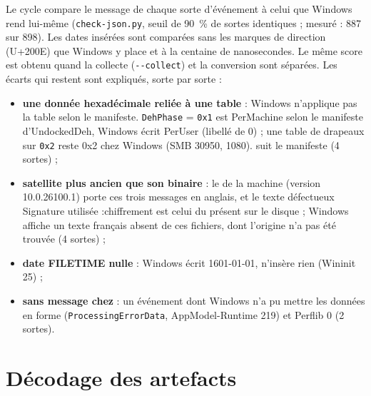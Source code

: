 \documentclass[11pt,a4paper,oneside]{report}
\begin{document}
Le cycle compare le message de chaque sorte d'événement à celui que Windows rend
lui-même (\texttt{check-json.py}, seuil de 90~\% de sortes identiques ; mesuré :
887 sur 898). Les dates insérées sont comparées sans les marques de direction
(U+200E) que Windows y place et à la centaine de nanosecondes. Le même score est
obtenu quand la collecte (\texttt{-{}-collect}) et la conversion sont séparées.
Les écarts qui restent sont expliqués, sorte par sorte :
\begin{itemize}
  \item \textbf{une donnée hexadécimale reliée à une table} : Windows n'applique
        pas la table selon le manifeste. \texttt{DehPhase} = \texttt{0x1} est
        \og PerMachine \fg{} selon le manifeste d'UndockedDeh, Windows écrit
        \og PerUser \fg{} (libellé de 0) ; une table de drapeaux sur
        \texttt{0x2} reste \og 0x2 \fg{} chez Windows (SMB 30950, 1080).
        \wac{} suit le manifeste (4 sortes) ;
  \item \textbf{satellite plus ancien que son binaire} : le
         de la machine (version
        10.0.26100.1) porte ces trois messages en anglais, et le texte
        défectueux \og Signature utilisée :chiffrement \fg{} est celui du
         présent sur le disque ; Windows affiche un texte
        français absent de ces fichiers, dont l'origine n'a pas été trouvée
        (4 sortes) ;
  \item \textbf{date FILETIME nulle} : Windows écrit 1601-01-01, \wac{}
        n'insère rien (Wininit 25) ;
  \item \textbf{sans message chez \wac{}} : un événement dont Windows n'a pu
        mettre les données en forme (\texttt{ProcessingErrorData},
        AppModel-Runtime 219) et Perflib 0 (2 sortes).
\end{itemize}

\section{Décodage des artefacts}
\end{document}
